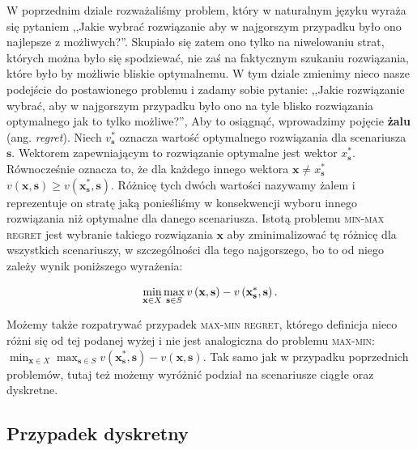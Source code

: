 W poprzednim dziale rozważaliśmy problem, który w naturalnym języku wyraża się pytaniem ,,Jakie wybrać rozwiązanie aby w najgorszym przypadku było ono najlepsze z możliwych?''. Skupiało się zatem ono tylko na niwelowaniu strat, których można było się spodziewać, nie zaś na faktycznym szukaniu rozwiązania, które było by możliwie bliskie optymalnemu. W tym dziale zmienimy nieco nasze podejście do postawionego problemu i zadamy sobie pytanie: ,,Jakie rozwiązanie wybrać, aby w najgorszym przypadku było ono na tyle blisko rozwiązania optymalnego jak to tylko możliwe?'', Aby to osiągnąć, wprowadzimy pojęcie \textbf{żalu} (ang. \textit{regret}). Niech $v_{\textbf{s}}^{\ast}$ oznacza wartość optymalnego rozwiązania dla scenariusza $\textbf{s}$. Wektorem zapewniającym to rozwiązanie optymalne jest wektor $x^{\ast}_{\textbf{s}}$. Równocześnie oznacza to, że dla każdego innego wektora $\textbf{x} \neq x^{\ast}_{\textbf{s}}$ $v \left( \textbf{x}, \textbf{s} \right) \geqslant v \left( \textbf{x}^{\ast}_{\textbf{s}}, \textbf{s} \right)$. Różnicę tych dwóch wartości nazywamy żalem i reprezentuje on stratę jaką ponieśliśmy w konsekwencji wyboru innego rozwiązania niż optymalne dla danego scenariusza. Istotą problemu \textsc{min-max regret} jest wybranie takiego rozwiązania $\textbf{x}$ aby zminimalizować tę różnicę dla wszystkich scenariuszy, w szczególności dla tego najgorszego, bo to od niego zależy wynik poniższego wyrażenia:

\begin{equation}
	\min_{\mathclap{\textbf{x} \in X}} \max_{\mathclap{\textbf{s} \in S}} v \left( \textbf{x}, \textbf{s} \right) - v \left( \textbf{x}^{\ast}_{\textbf{s}}, \textbf{s} \right)\text{.}
\end{equation}

Możemy także rozpatrywać przypadek \textsc{max-min regret}, którego definicja nieco różni się od tej podanej wyżej i nie jest analogiczna do problemu \textsc{max-min}: $\min_{\textbf{x} \in X} \max_{\textbf{s} \in S} v \left( \textbf{x}^{\ast}_{\textbf{s}}, \textbf{s} \right) - v \left( \textbf{x}, \textbf{s} \right)$. Tak samo jak w przypadku poprzednich problemów, tutaj też możemy wyróżnić podział na scenariusze ciągłe oraz dyskretne.

\subsection{Przypadek dyskretny}

